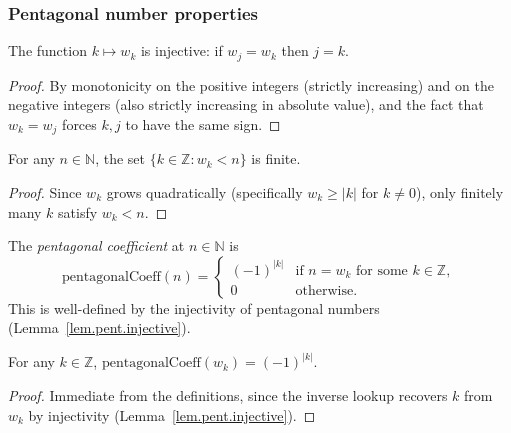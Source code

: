 \subsubsection{Pentagonal number properties}

\begin{lemma}
\label{lem.pent.injective}
\leanhelper
\leanok
The function $k\mapsto w_k$ is injective: if $w_j = w_k$ then $j = k$.
\end{lemma}

\begin{proof}
\leanok
By monotonicity on the positive integers (strictly increasing) and on the negative integers (also strictly increasing in absolute value), and the fact that
$w_k = w_j$ forces $k, j$ to have the same sign.
\end{proof}

\begin{lemma}
\label{lem.pent.below-finite}
\leanhelper
\leanok
For any $n\in\mathbb{N}$, the set $\{k\in\mathbb{Z} : w_k < n\}$ is finite.
\end{lemma}

\begin{proof}
\leanok
Since $w_k$ grows quadratically (specifically $w_k \geq |k|$ for $k\neq 0$),
only finitely many $k$ satisfy $w_k < n$.
\end{proof}

\begin{definition}
\label{def.pent.coeff}
\leanhelper
\leanok
The \emph{pentagonal coefficient} at $n\in\mathbb{N}$ is
\[
\mathrm{pentagonalCoeff}(n) =
\begin{cases}
(-1)^{|k|} & \text{if } n = w_k \text{ for some } k\in\mathbb{Z}, \\
0 & \text{otherwise}.
\end{cases}
\]
This is well-defined by the injectivity of pentagonal numbers
(Lemma~\ref{lem.pent.injective}).
\end{definition}

\begin{lemma}
\label{lem.pent.coeff-at-pentagonal}
\leanhelper
\leanok
For any $k\in\mathbb{Z}$,
$\mathrm{pentagonalCoeff}(w_k) = (-1)^{|k|}$.
\end{lemma}

\begin{proof}
\leanok
Immediate from the definitions, since the inverse lookup recovers $k$ from $w_k$
by injectivity (Lemma~\ref{lem.pent.injective}).
\end{proof}

